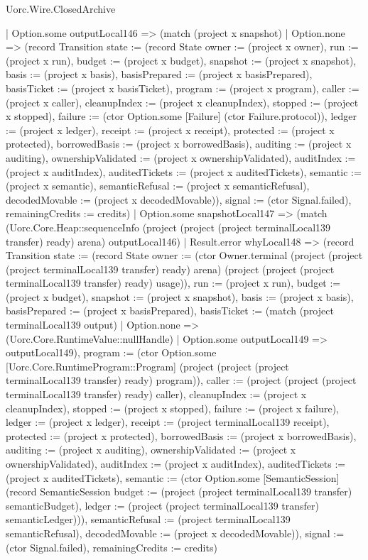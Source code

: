 \begin{lexlean}{Uorc.Wire.ClosedArchive}
\begin{semanticmodule}
{            | Option.some outputLocal146 => (match (project x snapshot)
              | Option.none => (record Transition {state := (record State {owner := (project x owner), run := (project x run), budget := (project x budget), snapshot := (project x snapshot), basis := (project x basis), basisPrepared := (project x basisPrepared), basisTicket := (project x basisTicket), program := (project x program), caller := (project x caller), cleanupIndex := (project x cleanupIndex), stopped := (project x stopped), failure := (ctor Option.some [Failure] (ctor Failure.protocol)), ledger := (project x ledger), receipt := (project x receipt), protected := (project x protected), borrowedBasis := (project x borrowedBasis), auditing := (project x auditing), ownershipValidated := (project x ownershipValidated), auditIndex := (project x auditIndex), auditedTickets := (project x auditedTickets), semantic := (project x semantic), semanticRefusal := (project x semanticRefusal), decodedMovable := (project x decodedMovable)}), signal := (ctor Signal.failed), remainingCredits := credits})
              | Option.some snapshotLocal147 => (match (Uorc.Core.Heap::sequenceInfo (project (project (project terminalLocal139 transfer) ready) arena) outputLocal146)
                | Result.error whyLocal148 => (record Transition {state := (record State {owner := (ctor Owner.terminal (project (project (project terminalLocal139 transfer) ready) arena) (project (project (project terminalLocal139 transfer) ready) usage)), run := (project x run), budget := (project x budget), snapshot := (project x snapshot), basis := (project x basis), basisPrepared := (project x basisPrepared), basisTicket := (match (project terminalLocal139 output)
                  | Option.none => (Uorc.Core.RuntimeValue::nullHandle)
                  | Option.some outputLocal149 => outputLocal149), program := (ctor Option.some [Uorc.Core.RuntimeProgram::Program] (project (project (project terminalLocal139 transfer) ready) program)), caller := (project (project (project terminalLocal139 transfer) ready) caller), cleanupIndex := (project x cleanupIndex), stopped := (project x stopped), failure := (project x failure), ledger := (project x ledger), receipt := (project terminalLocal139 receipt), protected := (project x protected), borrowedBasis := (project x borrowedBasis), auditing := (project x auditing), ownershipValidated := (project x ownershipValidated), auditIndex := (project x auditIndex), auditedTickets := (project x auditedTickets), semantic := (ctor Option.some [SemanticSession] (record SemanticSession {budget := (project (project terminalLocal139 transfer) semanticBudget), ledger := (project (project terminalLocal139 transfer) semanticLedger)})), semanticRefusal := (project terminalLocal139 semanticRefusal), decodedMovable := (project x decodedMovable)}), signal := (ctor Signal.failed), remainingCredits := credits})
}
\end{semanticmodule}
\end{lexlean}
